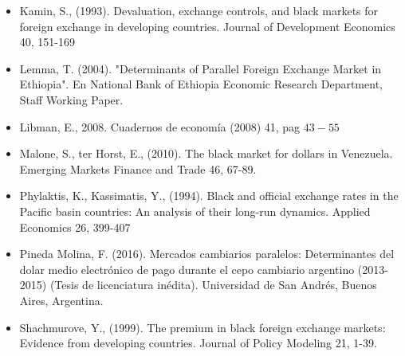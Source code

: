 \documentclass[11pt,a4paper]{article}
\begin{document}
\begin{itemize}
\item Kamin, S., (1993). Devaluation, exchange controls, and black markets for foreign exchange in developing countries. Journal of Development Economics 40, 151-169
\item Lemma, T. (2004). "Determinants of Parallel Foreign Exchange Market in Ethiopia". En National Bank of Ethiopia Economic Research Department, Staff Working Paper.
\item Libman, E., 2008. Cuadernos de economía (2008) 41, pag $43-55 $
\item Malone, S., ter Horst, E., (2010). The black market for dollars in Venezuela. Emerging Markets Finance and Trade 46, 67-89.
\item Phylaktis, K., Kassimatis, Y., (1994). Black and official exchange rates in the Pacific basin countries: An analysis of their long-run dynamics. Applied Economics 26, 399-407
\item Pineda Molina, F. (2016). Mercados cambiarios paralelos: Determinantes del dolar medio electrónico de pago durante el cepo cambiario argentino (2013-2015) (Tesis de licenciatura inédita). Universidad de San Andrés, Buenos Aires, Argentina.
\item Shachmurove, Y., (1999). The premium in black foreign exchange markets: Evidence from developing countries. Journal of Policy Modeling 21, 1-39.
\end{itemize}
\end{document}
